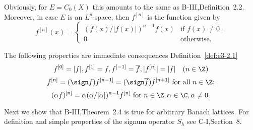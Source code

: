 Obviously, for $E = C_{0}(X)$ this amounts to the same as B-III,Definition~2.2.
Moreover, in case $E$ is an $L^p$-space, then $f^{[n]}$ is the function given by
\begin{equation}\label{eq:c3-2.2}
	f^{[n]}(x) = \begin{cases}
		(f(x)/|f(x)|)^{n-1}f(x) & \text{if } f(x) \neq 0\,, \\
		0 & \text{otherwise}.
	\end{cases}
\end{equation}

The following properties are immediate consequences Definition~\ref{def:c3-2.1}
\begin{equation}\label{eq:c3-2.3}
	f^{[0]} = |f|, f^{[1]} = f, f^{[-1]} = \overline{f}, |f^{[n]}| = |f| \quad (n \in \Z)
\end{equation}
\begin{equation}\label{eq:c3-2.4}
	f^{[n]} = (\sign  f)f^{[n-1]} = (\sign  \overline{f})f^{[n+1]} \text{ for all } n \in \Z;
\end{equation}
\begin{equation}\label{eq:c3-2.5}
	(\alpha f)^{[n]} = \alpha(\alpha/|\alpha|)^{n-1}f^{[n]} \text{ for } n \in \Z, \alpha \in \C , \alpha \neq 0.
\end{equation}

Next we show that B-III,Theorem~2.4 is true for arbitrary Banach lattices.
For definition and simple properties of the signum operator $S_{h}$ see C-I,Section~8.

